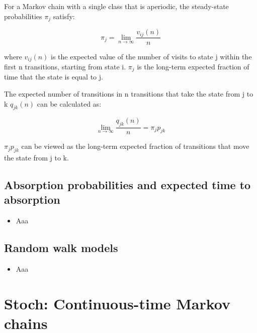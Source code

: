 \documentclass[12pt]{report}
\renewcommand{\_}{\kern-1.5pt\textunderscore\kern-1.5pt}
\begin{document}
\begin{itemize}
For a Markov chain with a single class that is aperiodic, the steady-state probabilities  \(  \pi _{j} \)  satisfy:\par

 \[  \pi _{j}=\mathop{\lim }_{n \rightarrow \infty}\frac{v_{ij} \left( n \right) }{n} \] \par

where  \( v_{ij} \left( n \right)  \)  is the expected value of the number of visits to state j within the first n transitions, starting from state i.  \(  \pi _{j} \)  is the long-term expected fraction of time that the state is equal to j. \par

The expected number of transitions in n transitions that take the state from j to k  \( q_{jk} \left( n \right)  \)  can be calculated as:\par

 \[ \mathop{\lim }_{n \rightarrow \infty}\frac{q_{jk} \left( n \right) }{n}= \pi _{j}p_{jk} \] \par

 \(  \pi _{j}p_{jk} \)  can be viewed as the long-term expected fraction of transitions that move the state from j to k.\par


\end{itemize}\subsection*{Absorption probabilities and expected time to absorption}
\begin{itemize}
	\item Aaa\par


\vspace{\baselineskip}

\end{itemize}\subsection*{Random walk models}
\begin{itemize}
	\item Aaa\par


\vspace{\baselineskip}

\end{itemize}\section*{Stoch: Continuous-time Markov chains}
\end{document}
